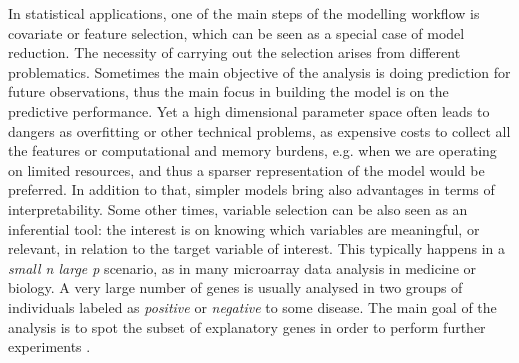 \documentclass[american,]{article}
\theoremstyle{definition}
\begin{document}
In statistical applications, one of the main steps of the modelling workflow is covariate or feature selection, which can be seen as a special case of model reduction. The necessity of carrying out the selection arises from different problematics. Sometimes the main objective of the analysis is doing prediction for future observations, thus the main focus in building the model is on the predictive performance. Yet a high dimensional parameter space often leads to dangers as overfitting or other technical problems, as expensive costs to collect all the features or computational and memory burdens, e.g. when we are operating on limited resources, and thus a sparser representation of the model would be preferred. In addition to that, simpler models bring also advantages in terms of interpretability. Some other times, variable selection can be also seen as an inferential tool: the interest is on knowing which variables are meaningful, or relevant, in relation to the target variable of interest. This typically happens in a \textit{small n large p} scenario, as in many microarray data analysis in medicine or biology. A very large number of genes is usually analysed in two groups of individuals labeled as \textit{positive} or \textit{negative} to some disease. The main goal of the analysis is to spot the subset of explanatory genes in order to perform further experiments \cite[see examples in][]{book:efron}.
\end{document}
